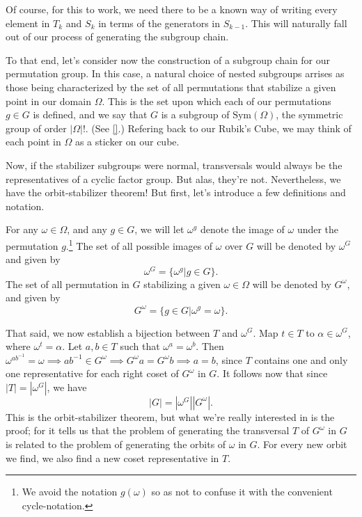 \documentclass[12pt]{article}
\begin{document}
Of course, for this to work, we need there to be a known way of
writing every element in $T_k$ and $S_k$ in terms of the generators in $S_{k-1}$.
This will naturally fall out of our process of generating the subgroup chain.

To that end, let's consider now the construction of a subgroup chain for
our permutation group.  In this case, a natural choice of nested subgroups arrises
as those being characterized by the set of all permutations that stabilize a
given point in our domain $\Omega$.  This is the set upon which each of our
permutations $g\in G$ is defined, and we say that $G$ is a subgroup of $\mbox{Sym}(\Omega)$,
the symmetric group of order $|\Omega|!$.  (See \ref{}.)  Refering back to our Rubik's
Cube, we may think of each point in $\Omega$ as a sticker on our cube.

Now, if the stabilizer subgroups were normal, transversals would always be
the representatives of a cyclic factor group.  But alas, they're not.  Nevertheless,
we have the orbit-stabilizer theorem!  But first, let's introduce a few definitions and
notation.

For any $\omega\in\Omega$, and any $g\in G$, we will let $\omega^g$ denote
the image of $\omega$ under the permutation $g$.\footnote{We avoid the
notation $g(\omega)$ so as not to confuse it with the convenient cycle-notation.}  The set of all possible
images of $\omega$ over $G$ will be denoted by $\omega^G$ and given by
\begin{equation*}
\omega^G = \{\omega^g|g\in G\}.
\end{equation*}
The set of all permutation in $G$ stabilizing a given $\omega\in\Omega$
will be denoted by $G^\omega$, and given by
\begin{equation*}
G^\omega = \{g\in G|\omega^g=\omega\}.
\end{equation*}

That said, we now establish a bijection between $T$ and $\omega^G$.
Map $t\in T$ to $\alpha\in\omega^G$, where $\omega^t=\alpha$.
Let $a,b\in T$ such that $\omega^a=\omega^b$.
Then $\omega^{ab^{-1}}=\omega\implies ab^{-1}\in G^{\omega}\implies G^{\omega}a=G^{\omega}b\implies a=b$,
since $T$ contains one and only one representative for each right coset of $G^\omega$ in $G$.
It follows now that since $|T|=|\omega^G|$, we have
\begin{equation*}
|G|=|\omega^G||G^{\omega}|.
\end{equation*}
This is the orbit-stabilizer theorem, but what we're really interested in
is the proof; for it tells us that the problem of generating the transversal $T$ of $G^{\omega}$ in $G$ is
related to the problem of generating the orbits of $\omega$ in $G$.
For every new orbit we find, we also find a new coset representative in $T$.
\end{document}
